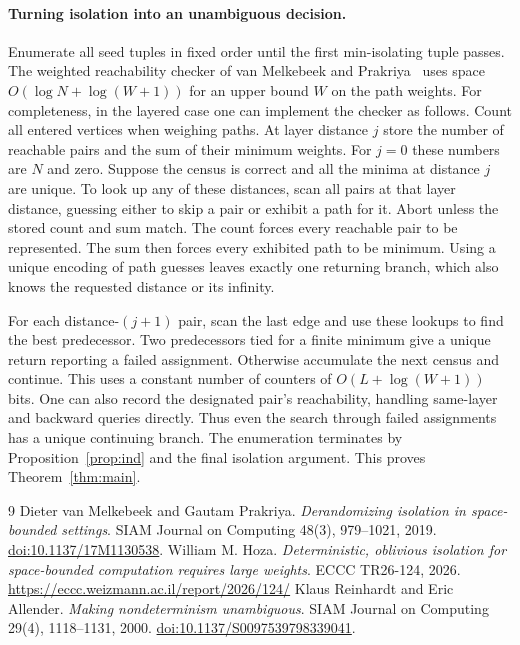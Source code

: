 \documentclass[11pt]{article}
\begin{document}
\paragraph{Turning isolation into an unambiguous decision.}
Enumerate all seed tuples in fixed order until the first min-isolating
tuple passes. The weighted reachability checker of van Melkebeek and
Prakriya~\cite[Lemma 3.5]{vMP} uses space $O(\log N+\log(W+1))$ for an
upper bound $W$ on the path weights. For completeness, in the layered
case one can implement the checker as follows. Count all entered vertices
when weighing paths. At layer distance $j$ store the number of reachable
pairs and the sum of their minimum weights. For $j=0$ these numbers are
$N$ and zero. Suppose the census is correct and all the minima at distance
$j$ are unique. To look up any of these distances, scan all pairs at that
layer distance, guessing either to skip a pair or exhibit a path for it.
Abort unless the stored count and sum match. The count forces every
reachable pair to be represented. The sum then forces every exhibited path
to be minimum. Using a unique encoding of path guesses leaves exactly one
returning branch, which also knows the requested distance or its infinity.

For each distance-$(j+1)$ pair, scan the last edge and use these lookups
to find the best predecessor. Two predecessors tied for a finite minimum give a unique
return reporting a failed assignment. Otherwise accumulate the next
census and continue. This uses a constant number of counters of
$O(L+\log(W+1))$ bits. One can also record the designated pair's reachability,
handling same-layer and backward queries directly. Thus even the search
through failed assignments has a unique continuing branch. The enumeration
terminates by Proposition~\ref{prop:ind} and the final isolation argument.
This proves Theorem~\ref{thm:main}.

\begin{thebibliography}{9}
 Dieter van Melkebeek and Gautam Prakriya.
\emph{Derandomizing isolation in space-bounded settings}.
SIAM Journal on Computing 48(3), 979--1021, 2019.
\href{https://doi.org/10.1137/17M1130538}{doi:10.1137/17M1130538}.
 William M. Hoza.
\emph{Deterministic, oblivious isolation for space-bounded computation requires large weights}.
ECCC TR26-124, 2026. \url{https://eccc.weizmann.ac.il/report/2026/124/}
 Klaus Reinhardt and Eric Allender.
\emph{Making nondeterminism unambiguous}.
SIAM Journal on Computing 29(4), 1118--1131, 2000.
\href{https://doi.org/10.1137/S0097539798339041}{doi:10.1137/S0097539798339041}.
\end{thebibliography}
\end{document}
